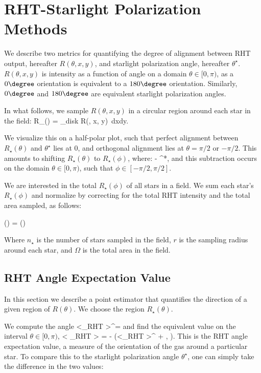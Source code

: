 \section{RHT-Starlight Polarization Methods}\label{starpolmethods}
We describe two metrics for quantifying the degree of alignment between RHT output, hereafter ${R(\theta, x, y)}$, and starlight polarization angle, hereafter ${\theta^\star}$. $R(\theta, x, y)$ is intensity as a function of angle on a domain ${\theta \in [0, \pi)}$, as a ${0 \degree}$ orientation is equivalent to a ${180 \degree}$ orientation. Similarly, ${0 \degree}$ and ${180 \degree}$ are equivalent starlight polarization angles.

In what follows, we sample ${R(\theta, x, y)}$ in a circular region around each star in the field:
\beq
R_\star(\theta)  = \iint \limits_{disk}  R(\theta, x, y)  \,dxdy.
\eeq
 
We visualize this on a half-polar plot, such that perfect alignment between ${R_\star(\theta)}$ and ${\theta^\star}$ lies at 0, and orthogonal alignment lies at ${\theta = \pi/2}$ or ${-\pi/2}$. This amounts to shifting $R_\star\left(\theta\right)$ to $R_\star\left(\phi\right)$, where:
\beq
\phi \equiv \theta - \theta^*,
\eeq
 and this subtraction occurs on the domain $\theta \in [0, \pi)$, such that $\phi \in [-\pi/2, \pi/2]$.

We are interested in the total $R_\star\left(\phi\right)$ of all stars in a field. We sum each star's $R_\star\left(\phi\right)$ and normalize by correcting for the total RHT intensity and the total area sampled, as follows:

\beq
{}\left(\phi\right) = \left(\right)
\eeq

Where $n_{\star}$ is the number of stars sampled in the field, $r$ is the sampling radius around each star, and $\Omega$ is the total area in the field.

\subsection{RHT Angle Expectation Value}\label{expectval}
In this section we describe a point estimator that quantifies the direction of a given region of ${R(\theta)}$. We choose the region $R_\star\left(\theta\right)$. 

We compute the angle
\beq
\label{carrotrht}
\left<\theta_{RHT} \right>^{\prime}=  \arctan {}
\eeq
and find the equivalent value on the interval ${\theta \in [0, \pi)}$,
\beq
\left< \theta_{RHT} \right> = \pi - (\left<\theta_{RHT} \right>^{\prime} + \pi, \pi).
\eeq
This is the RHT angle expectation value, a measure of the orientation of the gas around a particular star. To compare this to the starlight polarization angle $\theta^\star$, one can simply take the difference in the two values:

